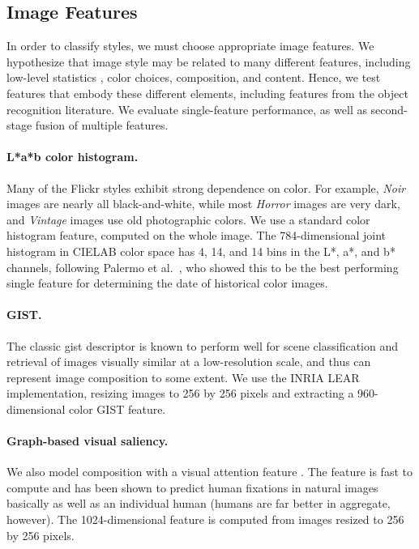 \subsection{Image Features}

In order to classify styles, we must choose appropriate image features.  We hypothesize that image style may be related to many different features, including low-level statistics \parencite{Lyu-PNAS-2004}, color choices, composition, and content.  Hence, we test features that embody these different elements, including features from the object recognition literature.
We evaluate single-feature performance, as well as second-stage fusion of multiple features.

\paragraph{L*a*b color histogram.}
Many of the Flickr styles exhibit strong dependence on color. For example, \emph{Noir} images are nearly all black-and-white, while most \emph{Horror} images are very dark, and \emph{Vintage} images use old photographic colors. We use a standard color histogram feature, computed on the whole image.
The 784-dimensional joint histogram in CIELAB color space has 4, 14, and 14 bins in the L*, a*, and b* channels, following Palermo et al.~\parencite{Palermo-ECCV-2012}, who showed this to be the best performing single feature for determining the date of historical color images.

\paragraph{GIST.}
The classic gist descriptor \parencite{Oliva-IJCV-2001} is known to perform well for scene classification and retrieval of images visually similar at a low-resolution scale, and thus can represent image composition to some extent.
We use the INRIA LEAR implementation, resizing images to 256 by 256 pixels and extracting a 960-dimensional color GIST feature.

\paragraph{Graph-based visual saliency.}
We also model composition with a visual attention feature \parencite{Harel-NIPS-2006}.
The feature is fast to compute and has been shown to predict human fixations in natural images basically as well as an individual human (humans are far better in aggregate, however).
The 1024-dimensional feature is computed from images resized to 256 by 256 pixels.

